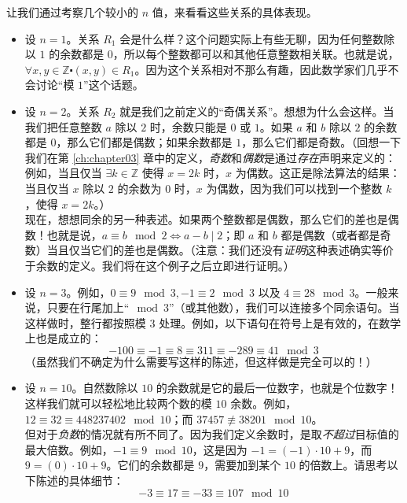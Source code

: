 \begin{example}
    让我们通过考察几个较小的 $n$ 值，来看看这些关系的具体表现。

    \begin{itemize}
        \item 设 $n=1$。关系 $R_1$ 会是什么样？这个问题实际上有些无聊，因为任何整数除以 $1$ 的余数都是 $0$，所以每个整数都可以和其他任意整数相关联。也就是说，$\forall x,y \in \mathbb{Z} \centerdot (x, y) \in R_1$。因为这个关系相对不那么有趣，因此数学家们几乎不会讨论``模 $1$''这个话题。
        \item 设 $n=2$。关系 $R_2$ 就是我们之前定义的``奇偶关系''。想想为什么会这样。当我们把任意整数 $a$ 除以 $2$ 时，余数只能是 $0$ 或 $1$。如果 $a$ 和 $b$ 除以 $2$ 的余数都是 $0$，那么它们都是偶数；如果余数都是 $1$，那么它们都是奇数。（回想一下我们在第 \ref{ch:chapter03} 章中的定义，\emph{奇数}和\emph{偶数}是通过\emph{存在}声明来定义的：例如，当且仅当 $\exists k \in \mathbb{Z}$ 使得 $x = 2k$ 时，$x$ 为偶数。这正是除法算法的结果：当且仅当 $x$ 除以 $2$ 的余数为 $0$ 时，$x$ 为偶数，因为我们可以找到一个整数 $k$，使得 $x = 2k$。）\\
        现在，想想同余的另一种表述。如果两个整数都是偶数，那么它们的差也是偶数！也就是说，$a \equiv b \mod 2 \iff a - b \mid 2$；即 $a$ 和 $b$ 都是偶数（或者都是奇数）当且仅当它们的差也是偶数。（注意：我们还没有\emph{证明}这种表述确实等价于余数的定义。我们将在这个例子之后立即进行证明。）
        \item 设 $n=3$。例如，$0 \equiv 9 \mod 3, -1 \equiv 2 \mod 3$ 以及 $4 \equiv 28 \mod 3$。一般来说，只要在行尾加上``$\mod 3$''（或其他数），我们可以连接多个同余语句。当这样做时，整行都按照模 $3$ 处理。例如，以下语句在符号上是有效的，在数学上也是成立的：
        \[-100 \equiv -1 \equiv 8 \equiv 311 \equiv -289 \equiv 41 \mod 3\]
        （虽然我们不确定为什么需要写这样的陈述，但这样做是完全可以的！）
        \item 设 $n=10$。自然数除以 $10$ 的余数就是它的最后一位数字，也就是个位数字！这样我们就可以轻松地比较两个数的模 $10$ 余数。例如，$12 \equiv 32 \equiv 448237402 \mod 10$；而 $37457 \not\equiv 38201 \mod 10$。\\
        但对于\emph{负数}的情况就有所不同了。因为我们定义余数时，是取\emph{不超过}目标值的最大倍数。例如，$-1 \equiv 9 \mod 10$，这是因为 $-1= (-1) \cdot 10 + 9$，而 $9 = (0) \cdot 10 + 9$。它们的余数都是 $9$，需要加到某个 $10$ 的倍数上。请思考以下陈述的具体细节：
        \[-3 \equiv 17 \equiv -33 \equiv 107 \mod 10\]
    \end{itemize}
\end{example}

